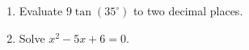 \documentclass[11pt]{article}
\begin{document}
\begin{enumerate}[leftmargin=*, itemsep=5cm]
  \item Evaluate $9\tan(35^\circ)$ to two decimal places.
  \item Solve $x^2 - 5x + 6 = 0$.
\end{enumerate}
\end{document}

